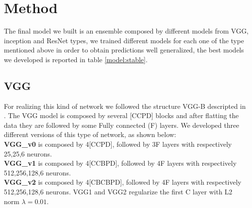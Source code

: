 \documentclass[10pt,twocolumn,letterpaper]{article}
\begin{document}
\section{Method}
The final model we built is an ensemble composed by different models from VGG, inception and ResNet types, we trained different models for each one of the type mentioned above in order to obtain predictions well generalized, the best models we developed is reported in table \ref{model:stable}.
\subsection{VGG}
\label{subsection:VGG}
For realizing this kind of network we followed the structure VGG-B descripted in \cite{24}. The VGG model is composed by several [CCPD] blocks and after flatting the data they are followed by some Fully connected (F) layers. We developed three different versions of this type of network, as shown below:
\\{\bf VGG\_v0} is composed by 4[CCPD], followed by 3F layers with respectively 25,25,6 neurons.
\\{\bf VGG\_v1} is composed by 4[CCBPD], followed by 4F layers with respectively 512,256,128,6 neurons.
\\{\bf VGG\_v2} is composed by 4[CBCBPD], followed by 4F layers with respectively 512,256,128,6 neurons.
VGG1 and VGG2 regularize the first C layer with L2 norm $\lambda=0.01$.
\end{document}

